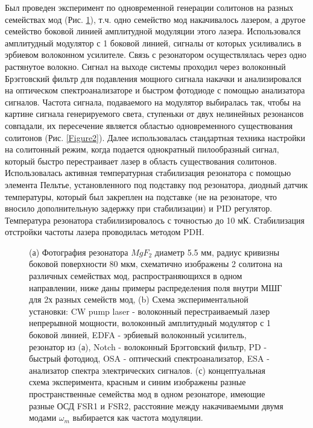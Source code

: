 Был проведен эксперимент по одновременной генерации солитонов на разных семействах мод (Рис. \ref{Figure1_V1_c}), т.ч. одно семейство мод накачивалось лазером, а другое семейство боковой линией амплитудной модуляции этого лазера. Использовался амплитудный модулятор с 1 боковой линией, сигналы от которых усиливались в эрбиевом волоконном усилителе. Связь с резонатором осуществлялась через одно растянутое волокно. Сигнал на выходе системы проходил через волоконный Брэгговский фильтр для подавления мощного сигнала накачки и анализировался на оптическом спектроанализаторе и быстром фотодиоде с помощью анализатора сигналов. Частота сигнала, подаваемого на модулятор выбиралась так, чтобы на картине сигнала генерируемого света, ступеньки от двух нелинейных резонансов совпадали, их пересечение является областью одновременного существования солитонов (Рис. \ref{Figure2}). Далее использовалась стандартная техника настройки на солитонный режим, когда подается однократный пилообразный сигнал, который быстро перестраивает лазер в область существования солитонов. Использовалась активная температурная стабилизация резонатора с помощью элемента Пельтье, установленного под подставку под резонатора, диодный датчик температуры, который был закреплен на подставке (не на резонаторе, что вносило дополнительную задержку при стабилизации) и PID регулятор. Температура резонатора стабилизировалось с точностью до 10 мК. Стабилизация отстройки частоты лазера проводилась методом PDH.

\begin{figure}[ht]
\begin{minipage}[ht]{1\linewidth}
\end{minipage}
\caption{(а) Фотография резонатора $MgF_2$ диаметр 5.5 мм, радиус кривизны боковой поверхности 80 мкм, схематично изображены 2 солитона на различных семействах мод, распространяющихся в одном направлении, ниже даны примеры распределения поля внутри МШГ для 2х разных семейств мод, (b) Схема экспериментальной установки: CW pump laser - волоконный перестраиваемый лазер непрерывной мощности, волоконный амплитудный модулятор с 1 боковой линией, EDFA - эрбиевый волоконный усилитель, резонатор из (а), Notch - волоконный Брэгговский фильтр, PD - быстрый фотодиод, OSA - оптический спектроанализатор, ESA - анализатор спектра электрических сигналов. (с) концептуальная схема эксперимента, красным и синим изображены разные пространственные семейства мод в одном резонаторе, имеющие разные ОСД FSR1 и FSR2, расстояние между накачиваемыми двумя модами $\omega_m$ выбирается как частота модуляции.}
\label{Figure1_V1_c}
\end{figure}

